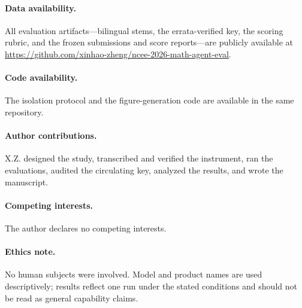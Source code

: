 \documentclass[11pt]{article}
\theoremstyle{plain}
\begin{document}
\paragraph*{Data availability.}
All evaluation artifacts---bilingual stems, the errata-verified key, the
scoring rubric, and the frozen submissions and score reports---are
publicly available at
\url{https://github.com/xinhao-zheng/ncee-2026-math-agent-eval}.

\paragraph*{Code availability.}
The isolation protocol and the figure-generation code are available in
the same repository.

\paragraph*{Author contributions.}
X.Z. designed the study, transcribed and verified the instrument, ran
the evaluations, audited the circulating key, analyzed the results, and
wrote the manuscript.

\paragraph*{Competing interests.}
The author declares no competing interests.

\paragraph*{Ethics note.}
No human subjects were involved. Model and product names are used
descriptively; results reflect one run under the stated conditions and
should not be read as general capability claims.
\end{document}
